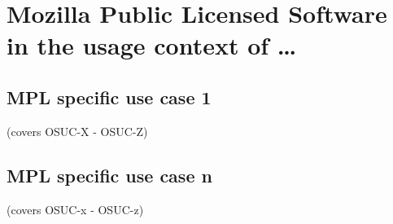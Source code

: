 %
%
%
%
%



\section{Mozilla Public Licensed Software in the usage context of \ldots}
\label{OSUC-01-MPL} \label{OSUC-03-MPL} 
\label{OSUC-06-MPL} \label{OSUC-09-MPL}

\label{OSUC-02-MPL} \label{OSUC-04-MPL} \label{OSUC-05-MPL}
\label{OSUC-07-MPL} \label{OSUC-08-MPL} \label{OSUC-10-MPL}


\subsection{MPL specific use case 1}
(covers OSUC-X - OSUC-Z)

\subsection{MPL specific use case n}
(covers OSUC-x - OSUC-z)


%
